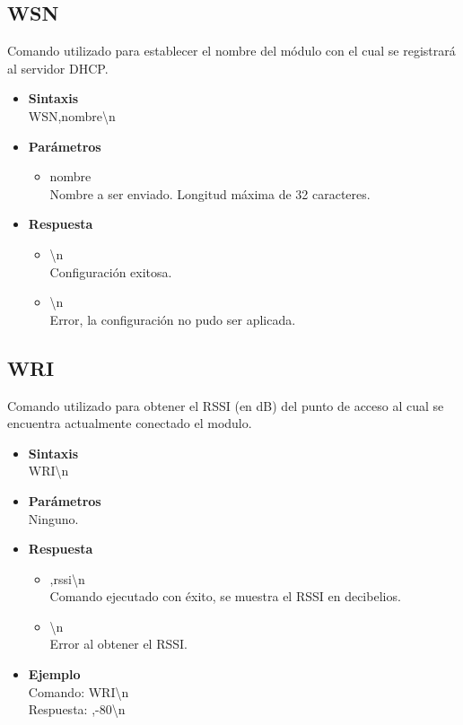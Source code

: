 \documentclass[a4paper,spanish]{article}
\begin{document}
\subsection{WSN}
Comando utilizado para establecer el nombre del módulo con el cual se registrará al servidor DHCP.
\begin{itemize}
	\item \textbf{Sintaxis}\\
	{\ttfamily WSN,nombre\textbackslash n}
	\item \textbf{Parámetros}\\
	\begin{itemize}
		\item{\ttfamily nombre}\\
		 Nombre a ser enviado. Longitud máxima de 32 caracteres. 
	\end{itemize}
	\item \textbf{Respuesta}
	\begin{itemize}
		\item{\textbackslash n} \\
		Configuración exitosa.
		\item{\textbackslash n} \\
		Error, la configuración no pudo ser aplicada.
	\end{itemize}
\end{itemize}









\subsection{WRI}
Comando utilizado para obtener el RSSI (en dB) del punto de acceso al cual se encuentra actualmente conectado el modulo.
\begin{itemize}
	\item \textbf{Sintaxis}\\
	{\ttfamily WRI\textbackslash n}
	\item \textbf{Parámetros}\\
	Ninguno.
	\item \textbf{Respuesta}
	\begin{itemize}
		\item{,rssi\textbackslash n}\\
		Comando ejecutado con éxito, se muestra el RSSI en decibelios.
		\item{\textbackslash n} \\
		Error al obtener el RSSI.
	\end{itemize}
	\item\textbf{Ejemplo}\\
	Comando: {\ttfamily WRI\textbackslash n}\\
	Respuesta: {,-80\textbackslash n}
\end{itemize}
\end{document}
